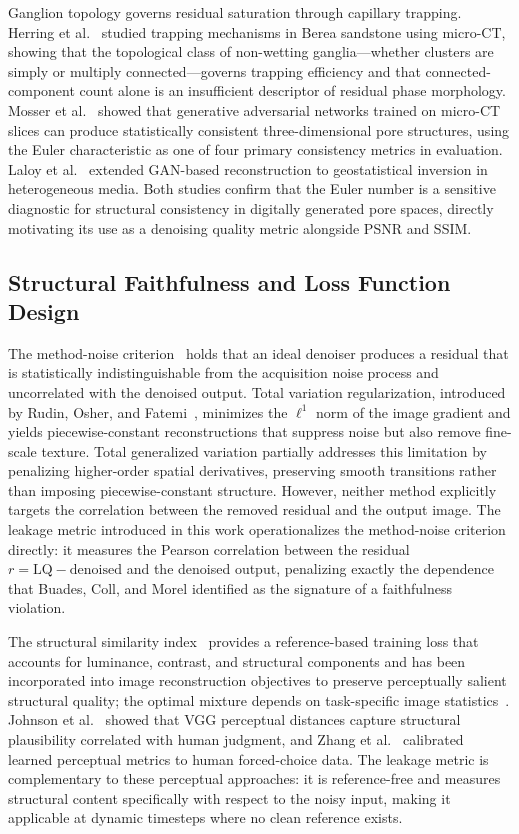\documentclass[review,12pt]{elsarticle}
\begin{document}
Ganglion topology governs residual saturation through capillary
trapping.  Herring et al.~\cite{Herring2013} studied trapping
mechanisms in Berea sandstone using micro-CT, showing that the
topological class of non-wetting ganglia---whether clusters are simply
or multiply connected---governs trapping efficiency and that
connected-component count alone is an insufficient descriptor of residual
phase morphology.  Mosser et al.~\cite{Mosser2017} showed that
generative adversarial networks trained on micro-CT slices can produce
statistically consistent three-dimensional pore structures, using the
Euler characteristic as one of four primary consistency metrics in
evaluation.  Laloy et al.~\cite{Laloy2018} extended GAN-based
reconstruction to geostatistical inversion in heterogeneous media.  Both
studies confirm that the Euler number is a sensitive diagnostic for
structural consistency in digitally generated pore spaces, directly
motivating its use as a denoising quality metric alongside PSNR and SSIM.

\subsection{Structural Faithfulness and Loss Function Design}
\label{sec:related:faithfulness}

The method-noise criterion~\cite{Buades2005siam} holds that an ideal
denoiser produces a residual that is statistically indistinguishable
from the acquisition noise process and uncorrelated with the denoised
output.  Total variation regularization, introduced by Rudin, Osher, and
Fatemi~\cite{Rudin1992}, minimizes the $\ell^1$ norm of the image
gradient and yields piecewise-constant reconstructions that suppress
noise but also remove fine-scale texture.  Total generalized variation
\cite{Bredies2010} partially addresses this limitation by penalizing
higher-order spatial derivatives, preserving smooth transitions rather
than imposing piecewise-constant structure.  However, neither method
explicitly targets the correlation between the removed residual and the
output image.  The leakage metric introduced in this work
operationalizes the method-noise criterion directly: it measures the
Pearson correlation between the residual $r = \mathrm{LQ} -
\mathrm{denoised}$ and the denoised output, penalizing exactly the
dependence that Buades, Coll, and Morel identified as the signature of
a faithfulness violation.

The structural similarity index~\cite{Wang2004} provides a
reference-based training loss that accounts for luminance, contrast, and
structural components and has been incorporated into image reconstruction
objectives to preserve perceptually salient structural quality; the
optimal mixture depends on task-specific image
statistics~\cite{Zhao2017}.  Johnson et al.~\cite{Johnson2016} showed
that VGG perceptual distances capture structural plausibility correlated
with human judgment, and Zhang et al.~\cite{Zhang2018lpips} calibrated
learned perceptual metrics to human forced-choice data.  The leakage
metric is complementary to these perceptual approaches: it is
reference-free and measures structural content specifically with respect
to the noisy input, making it applicable at dynamic timesteps where no
clean reference exists.
\end{document}
